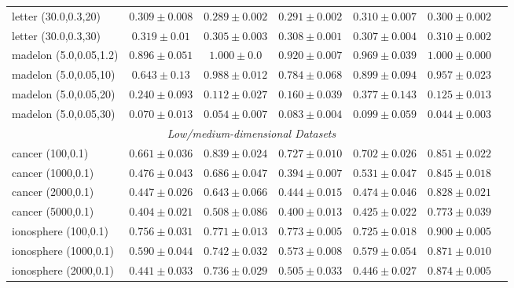 \begin{footnotesize}
\begin{table}[p!]
\begin{tabular}{lcccccc}
letter (30.0,0.3,20)  & $0.309 \pm 0.008$ &  $0.289 \pm 0.002$ &  $0.291 \pm 0.002$ &  $0.310 \pm 0.007$ & $0.300 \pm  0.002$   \\
letter (30.0,0.3,30)  & $0.319 \pm 0.01$  &  $0.305 \pm 0.003$ &  $0.308 \pm 0.001$ &  $0.307 \pm 0.004$ & $0.310 \pm  0.002$   \\
\midrule
madelon (5.0,0.05,1.2)& $0.896 \pm 0.051$ &  $1.000 \pm 0.0$   &  $0.920 \pm 0.007$ &  $0.969 \pm 0.039$ & $1.000 \pm  0.000$   \\
madelon (5.0,0.05,10) & $0.643 \pm 0.13$  &  $0.988 \pm 0.012$ &  $0.784 \pm 0.068$ &  $0.899 \pm 0.094$ & $0.957 \pm  0.023$   \\
madelon (5.0,0.05,20) & $0.240 \pm 0.093$ &  $0.112 \pm 0.027$ &  $0.160 \pm 0.039$ &  $0.377 \pm 0.143$ & $0.125 \pm  0.013$  \\
madelon (5.0,0.05,30) & $0.070 \pm 0.013$ &  $0.054 \pm 0.007$ &  $0.083 \pm 0.004$ &  $0.099 \pm 0.059$ & $0.044 \pm  0.003$   \\
\midrule
\multicolumn{6}{c}{\textit{Low/medium-dimensional Datasets}}\\
cancer (100,0.1)   & $0.661 \pm 0.036$ &  $0.839 \pm 0.024$ &  $0.727 \pm 0.010$ &  $0.702 \pm 0.026$ & $0.851 \pm  0.022$ \\
cancer (1000,0.1) & $0.476 \pm 0.043$ &  $0.686 \pm 0.047$ &  $0.394 \pm 0.007$ &  $0.531 \pm 0.047$ & $0.845 \pm  0.018$ \\
cancer (2000,0.1)  & $0.447 \pm 0.026$ &  $0.643 \pm 0.066$ &  $0.444 \pm 0.015$ &  $0.474 \pm 0.046$ & $0.828 \pm  0.021$ \\
cancer (5000,0.1)  & $0.404 \pm 0.021$ &  $0.508 \pm 0.086$ &  $0.400 \pm 0.013$ &  $0.425 \pm 0.022$ & $0.773 \pm  0.039$ \\
\midrule
ionosphere (100,0.1)      & $0.756 \pm 0.031$ &  $0.771 \pm 0.013$ &  $0.773 \pm 0.005$ &  $0.725 \pm 0.018$ & $0.900 \pm  0.005$ \\
ionosphere (1000,0.1)     & $0.590 \pm 0.044$ &  $0.742 \pm 0.032$ &  $0.573 \pm 0.008$ &  $0.579 \pm 0.054$ & $0.871 \pm  0.010$ \\
ionosphere (2000,0.1)     & $0.441 \pm 0.033$ &  $0.736 \pm 0.029$ &  $0.505 \pm 0.033$ &  $0.446 \pm 0.027$ & $0.874 \pm  0.005$ \\

\end{tabular}
\end{table}
\end{footnotesize}
